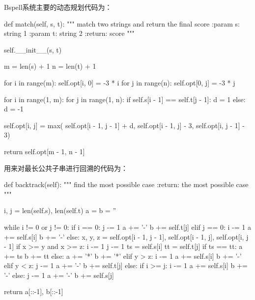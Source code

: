 \documentclass[UTF8,a4paper]{ctexart}
\begin{document}
\begin{itemize}
  Bspell系统主要的动态规划代码为：

  \begin{python}
    def match(self, s, t):
        """
        match two strings and return the final score
        :param s: string 1
        :param t: string 2
        :return: score
        """
        
        self.__init__(s, t)

        m = len(s) + 1
        n = len(t) + 1

        for i in range(m):
            self.opt[i, 0] = -3 * i
        for j in range(n):
            self.opt[0, j] = -3 * j

        for i in range(1, m):
            for j in range(1, n):
                if self.s[i - 1] == self.t[j - 1]:
                    d = 1
                else:
                    d = -1

                self.opt[i, j] = max(
                    self.opt[i - 1, j - 1] + d,
                    self.opt[i - 1, j] - 3,
                    self.opt[i, j - 1] - 3)

        return self.opt[m - 1, n - 1]
  \end{python}

  用来对最长公共子串进行回溯的代码为：

  \begin{python}
    def backtrack(self):
        """
        find the most possible case
        :return: the most possible case
        """

        i, j = len(self.s), len(self.t)
        a = b = ''

        while i != 0 or j != 0:
            if i == 0:
                j -= 1
                a += '-'
                b += self.t[j]
            elif j == 0:
                i -= 1
                a += self.s[i]
                b += '-'
            else:
                x, y, z = self.opt[i - 1, j - 1], self.opt[i - 1, j], self.opt[i, j - 1]
                if x >= y and x >= z:
                    i -= 1
                    j -= 1
                    ts = self.s[i]
                    tt = self.t[j]
                    if ts == tt:
                        a += ts
                        b += tt
                    else:
                        a += '*'
                        b += '*'
                elif y > z:
                    i -= 1
                    a += self.s[i]
                    b += '-'
                elif y < z:
                    j -= 1
                    a += '-'
                    b += self.t[j]
                else:
                    if i >= j:
                        i -= 1
                        a += self.s[i]
                        b += '-'
                    else:
                        j -= 1
                        a += '-'
                        b += self.s[j]

        return a[::-1], b[::-1]
  \end{python}

\end{itemize}
\end{document}
